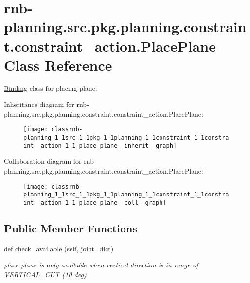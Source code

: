 \hypertarget{classrnb-planning_1_1src_1_1pkg_1_1planning_1_1constraint_1_1constraint__action_1_1_place_plane}{}\section{rnb-\/planning.src.\+pkg.\+planning.\+constraint.\+constraint\+\_\+action.\+Place\+Plane Class Reference}
\label{classrnb-planning_1_1src_1_1pkg_1_1planning_1_1constraint_1_1constraint__action_1_1_place_plane}


\hyperlink{classrnb-planning_1_1src_1_1pkg_1_1planning_1_1constraint_1_1constraint__action_1_1_binding}{Binding} class for placing plane.  




Inheritance diagram for rnb-\/planning.src.\+pkg.\+planning.\+constraint.\+constraint\+\_\+action.\+Place\+Plane\+:
\nopagebreak
\begin{figure}[H]
\begin{center}
\leavevmode
\texttt{[image: classrnb-planning\_1\_1src\_1\_1pkg\_1\_1planning\_1\_1constraint\_1\_1constraint\_\_action\_1\_1\_place\_plane\_\_inherit\_\_graph]}
\end{center}
\end{figure}


Collaboration diagram for rnb-\/planning.src.\+pkg.\+planning.\+constraint.\+constraint\+\_\+action.\+Place\+Plane\+:
\nopagebreak
\begin{figure}[H]
\begin{center}
\leavevmode
\texttt{[image: classrnb-planning\_1\_1src\_1\_1pkg\_1\_1planning\_1\_1constraint\_1\_1constraint\_\_action\_1\_1\_place\_plane\_\_coll\_\_graph]}
\end{center}
\end{figure}
\subsection*{Public Member Functions}
\begin{DoxyCompactItemize}
\item 
\mbox{\label{classrnb-planning_1_1src_1_1pkg_1_1planning_1_1constraint_1_1constraint__action_1_1_place_plane_a3a0d9a5e913caee69fd74db1d113a3e9}} 
def \hyperlink{classrnb-planning_1_1src_1_1pkg_1_1planning_1_1constraint_1_1constraint__action_1_1_place_plane_a3a0d9a5e913caee69fd74db1d113a3e9}{check\+\_\+available} (self, joint\+\_\+dict)
\begin{DoxyCompactList}\small\item\em place plane is only available when vertical direction is in range of V\+E\+R\+T\+I\+C\+A\+L\+\_\+\+C\+UT (10 deg) \end{DoxyCompactList}\end{DoxyCompactItemize}
